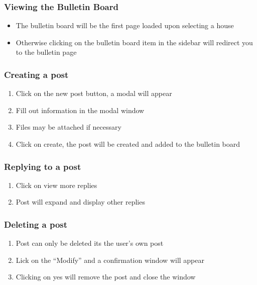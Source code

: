\documentclass[12pt]{article}
\begin{document}
    \subsubsection{Viewing the Bulletin Board}
    \begin{itemize}
        \item The bulletin board will be the first page loaded upon selecting a house
        \item Otherwise clicking on the bulletin board item in the sidebar will redirect you to the bulletin page
    \end{itemize}

    \subsubsection{Creating a post}
    \begin{enumerate}
        \item Click on the new post button, a modal will appear
        \item Fill out information in the modal window
        \item Files may be attached if necessary
        \item Click on create, the post will be created and added to the bulletin board
    \end{enumerate}

    \subsubsection{Replying to a post}
    \begin{enumerate}
        \item Click on view more replies
        \item Post will expand and display other replies
    \end{enumerate}

    \subsubsection{Deleting a post}
    \begin{enumerate}
        \item Post can only be deleted its the user's own post
        \item Lick on the ``Modify'' and a confirmation window will appear
        \item Clicking on yes will remove the post and close the window
    \end{enumerate}
\end{document}
